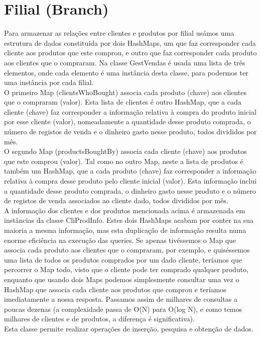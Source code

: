\documentclass[a4paper]{report}
\begin{document}
	\section{Filial (Branch)}
	Para armazenar as relações entre clientes e produtos por filial usámos uma estrutura de dados constituída por dois HashMaps, um que faz corresponder cada cliente aos produtos que este comprou, e outro que faz corresponder cada produto aos clientes que o compraram. Na classe GestVendas é usada uma lista de três elementos, onde cada elemento é uma instância desta classe, para podermos ter uma instância por cada filial.\\
	\indent
	O primeiro Map (clientsWhoBought) associa cada produto (chave) aos clientes que o compraram (valor). Esta lista de clientes é outro HashMap, que a cada cliente (chave) faz corresponder a informação relativa à compra do produto inicial por esse cliente (valor), nomeadamente a quantidade desse produto comprada, o número de registos de venda e o dinheiro gasto nesse produto, todos divididos por mês.\\
	\indent
	O segundo Map (productsBoughtBy) associa cada cliente (chave) aos produtos que este comprou (valor). Tal como no outro Map, neste a lista de produtos é também um HashMap, que a cada produto (chave) faz corresponder a informação relativa à compra desse produto pelo cliente inicial (valor). Esta informação inclui a quantidade desse produto comprada, o dinheiro gasto nesse produto e o número de registos de venda associados ao cliente dado, todos divididos por mês.\\
	\indent
	A informação dos clientes e dos produtos mencionada acima é armazenada em instâncias da classe CliProdInfo.
	\indent
	Estes dois HashMaps acabam por conter na sua maioria a mesma informação, mas esta duplicação de informação resulta numa enorme eficiência na execução das queries. Se apenas tivéssemos o Map que associa cada produto aos clientes que o compraram, por exemplo, e quiséssemos uma lista de todos os produtos comprados por um dado cliente, teríamos que percorrer o Map todo, visto que o cliente pode ter comprado qualquer produto, enquanto que usando dois Maps podemos simplesmente consultar uma vez o HashMap que associa cada cliente aos produtos que comprou e teríamos imediatamente a nossa resposta. Passamos assim de milhares de consultas a poucas dezenas (a complexidade passa de O(N) para O(log N), e como temos milhares de clientes e de produtos, a diferença é significativa).\\
	\indent
	Esta classe permite realizar operações de inserção, pesquisa e obtenção de dados.
	
\end{document}
